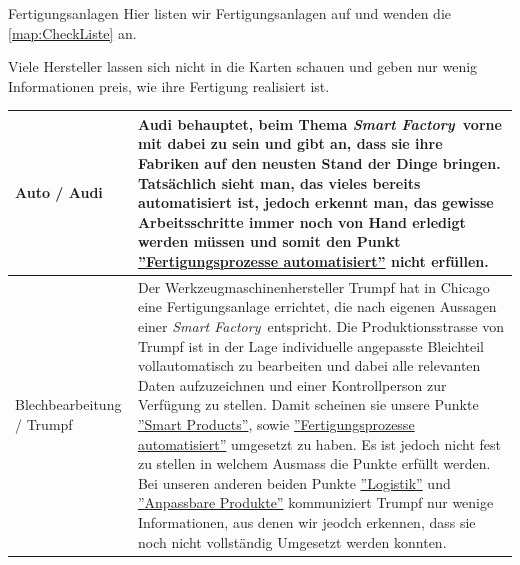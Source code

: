 \documentclass{article}
\def\SmartFactory{\textcolor{DarkestGray}{\textit{Smart Factory}}}
\begin{document}
\begin{Map}{Fertigungsanlagen}\label{map:Fertigungsanlagen}
Hier listen wir Fertigungsanlagen auf und wenden die \ref{map:CheckListe} an.

Viele Hersteller lassen sich nicht in die Karten schauen und geben nur wenig Informationen preis, wie ihre Fertigung realisiert ist. 
\par\medskip
\begin{tabular}{p{3.2cm}p{8cm}}\toprule
  Auto / Audi & Audi behauptet, beim Thema \SmartFactory\ vorne mit dabei zu sein und gibt an, dass sie ihre Fabriken auf den neusten Stand der Dinge bringen. Tatsächlich sieht man, das vieles bereits automatisiert ist, jedoch erkennt man, das gewisse Arbeitsschritte immer noch von Hand erledigt werden müssen und somit den Punkt \hyperlink{CheckListe:Fertigungsprozess}{''Fertigungsprozesse automatisiert''} nicht erfüllen.\cite{Audi}\cite{AudiKommentarlos}\\\midrule
  Blechbearbeitung / Trumpf & Der Werkzeugmaschinenhersteller Trumpf hat in Chicago eine Fertigungsanlage errichtet, die nach eigenen Aussagen einer \SmartFactory\ entspricht. Die Produktionsstrasse von Trumpf ist in der Lage individuelle angepasste Bleichteil vollautomatisch zu bearbeiten und dabei alle relevanten Daten aufzuzeichnen und einer Kontrollperson zur Verfügung zu stellen. Damit scheinen sie unsere Punkte \hyperlink{CheckListe:Fertigungsprozess}{''Smart Products''}, sowie \hyperlink{CheckListe:Fertigungsprozess}{''Fertigungsprozesse automatisiert''} umgesetzt zu haben. Es ist jedoch nicht fest zu stellen in welchem Ausmass die  Punkte erfüllt werden. Bei unseren anderen beiden Punkte \hyperlink{CheckListe:Fertigungsprozess}{''Logistik''} und \hyperlink{CheckListe:Fertigungsprozess}{''Anpassbare Produkte''} kommuniziert Trumpf nur wenige Informationen, aus denen wir jeodch erkennen, dass sie noch nicht vollständig Umgesetzt werden konnten.\cite{Cicago}\cite{Automationspraxis}\\\bottomrule
\end{tabular}


\end{Map}
\end{document}
